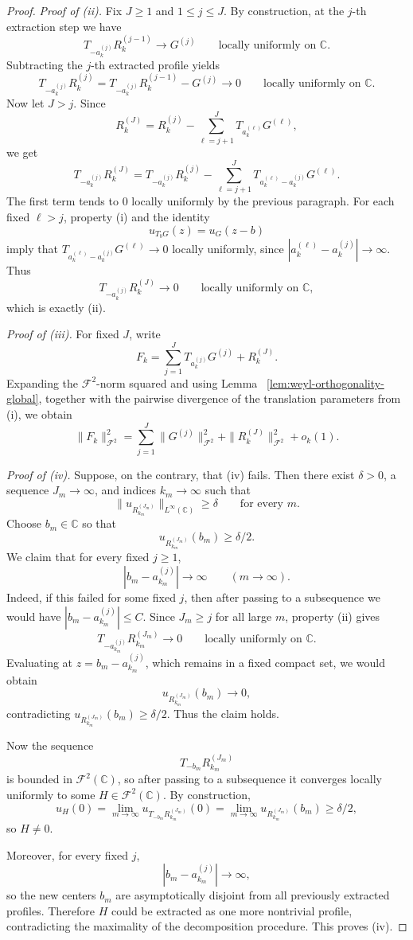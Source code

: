 \documentclass[a4paper,11pt,reqno]{amsart}
\numberwithin{equation}{section}
\theoremstyle{plain} %
\theoremstyle{definition} %
\theoremstyle{remark}
\newcommand{\C}{\mathbb{C}}
\begin{document}
\begin{proof}
\medskip
\noindent\emph{Proof of (ii).}
Fix \(J\ge 1\) and \(1\le j\le J\). By construction, at the \(j\)-th extraction
step we have
\[
T_{-a_k^{(j)}}R_k^{(j-1)}\to G^{(j)}
\qquad\text{locally uniformly on }\C.
\]
Subtracting the \(j\)-th extracted profile yields
\[
T_{-a_k^{(j)}}R_k^{(j)}
=
T_{-a_k^{(j)}}R_k^{(j-1)}-G^{(j)}
\to 0
\qquad\text{locally uniformly on }\C.
\]
Now let \(J>j\). Since
\[
R_k^{(J)}
=
R_k^{(j)}-\sum_{\ell=j+1}^J T_{a_k^{(\ell)}}G^{(\ell)},
\]
we get
\[
T_{-a_k^{(j)}}R_k^{(J)}
=
T_{-a_k^{(j)}}R_k^{(j)}
-\sum_{\ell=j+1}^J T_{a_k^{(\ell)}-a_k^{(j)}}G^{(\ell)}.
\]
The first term tends to \(0\) locally uniformly by the previous paragraph. For
each fixed \(\ell>j\), property (i) and the identity
\[
u_{T_b G}(z)=u_G(z-b)
\]
imply that \(T_{a_k^{(\ell)}-a_k^{(j)}}G^{(\ell)}\to 0\) locally uniformly, since
\(|a_k^{(\ell)}-a_k^{(j)}|\to\infty\). Thus
\[
T_{-a_k^{(j)}}R_k^{(J)}\to 0
\qquad\text{locally uniformly on }\C,
\]
which is exactly (ii).

\medskip
\noindent\emph{Proof of (iii).}
For fixed \(J\), write
\[
F_k=\sum_{j=1}^J T_{a_k^{(j)}}G^{(j)}+R_k^{(J)}.
\]
Expanding the \(\mathcal F^2\)-norm squared and using Lemma
~\ref{lem:weyl-orthogonality-global}, together with the pairwise divergence of the
translation parameters from (i), we obtain
\[
\|F_k\|_{\mathcal F^2}^2
=
\sum_{j=1}^J \|G^{(j)}\|_{\mathcal F^2}^2
+\|R_k^{(J)}\|_{\mathcal F^2}^2
+o_k(1).
\]

\medskip
\noindent\emph{Proof of (iv).}
Suppose, on the contrary, that (iv) fails. Then there exist \(\delta>0\), a
sequence \(J_m\to\infty\), and indices \(k_m\to\infty\) such that
\[
\|u_{R_{k_m}^{(J_m)}}\|_{L^\infty(\C)}\ge \delta
\qquad\text{for every }m.
\]
Choose \(b_m\in \C\) so that
\[
u_{R_{k_m}^{(J_m)}}(b_m)\ge \delta/2.
\]
We claim that for every fixed \(j\ge 1\),
\[
|b_m-a_{k_m}^{(j)}|\to\infty
\qquad (m\to\infty).
\]
Indeed, if this failed for some fixed \(j\), then after passing to a subsequence
we would have \(|b_m-a_{k_m}^{(j)}|\le C\). Since \(J_m\ge j\) for all large \(m\),
property (ii) gives
\[
T_{-a_{k_m}^{(j)}}R_{k_m}^{(J_m)}\to 0
\qquad\text{locally uniformly on }\C.
\]
Evaluating at \(z=b_m-a_{k_m}^{(j)}\), which remains in a fixed compact set, we
would obtain
\[
u_{R_{k_m}^{(J_m)}}(b_m)\to 0,
\]
contradicting \(u_{R_{k_m}^{(J_m)}}(b_m)\ge \delta/2\). Thus the claim holds.

Now the sequence
\[
T_{-b_m}R_{k_m}^{(J_m)}
\]
is bounded in \(\mathcal F^2(\C)\), so after passing to a subsequence it converges
locally uniformly to some \(H\in \mathcal F^2(\C)\). By construction,
\[
u_H(0)=\lim_{m\to\infty}u_{T_{-b_m}R_{k_m}^{(J_m)}}(0)
=
\lim_{m\to\infty}u_{R_{k_m}^{(J_m)}}(b_m)\ge \delta/2,
\]
so \(H\neq 0\).

Moreover, for every fixed \(j\),
\[
|b_m-a_{k_m}^{(j)}|\to\infty,
\]
so the new centers \(b_m\) are asymptotically disjoint from all previously
extracted profiles. Therefore \(H\) could be extracted as one more nontrivial
profile, contradicting the maximality of the decomposition procedure. This proves
(iv).
\end{proof}
\end{document}

